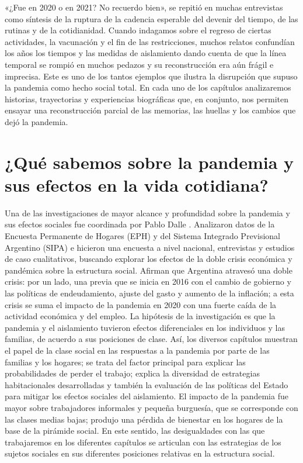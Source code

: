 \begin{refsection}
«¿Fue en 2020 o en 2021? No recuerdo bien», se repitió en muchas entrevistas como síntesis de la ruptura de la cadencia esperable del devenir del tiempo, de las rutinas y de la cotidianidad. Cuando indagamos sobre el regreso de ciertas actividades, la vacunación y el fin de las restricciones, muchos relatos confundían los años los tiempos y las medidas de aislamiento dando cuenta de que la línea temporal se rompió en muchos pedazos y su reconstrucción era aún frágil e imprecisa. Este es uno de los tantos ejemplos que ilustra la disrupción que supuso la pandemia como hecho social total. En cada uno de los capítulos analizaremos historias, trayectorias y experiencias biográficas que, en conjunto, nos permiten ensayar una reconstrucción parcial de las memorias, las huellas y los cambios que dejó la pandemia.


\section[¿Qué sabemos sobre la pandemia y sus efectos en la vida cotidiana?]{¿Qué sabemos sobre la pandemia y sus efectos en la vida cotidiana?}
\label{cap-21.que-sabemos-sobre-la-pandemia-y-sus-efectos-en-la-vida-cotidiana}
Una de las investigaciones de mayor alcance y profundidad sobre la pandemia y sus efectos sociales fue coordinada por Pablo Dalle \protect\parencite*{4181-DALLE2022}. Analizaron datos de la Encuesta Permanente de Hogares (EPH) y del Sistema Integrado Previsional Argentino (SIPA) e hicieron una encuesta a nivel nacional, entrevistas y estudios de caso cualitativos, buscando explorar los efectos de la doble crisis económica y pandémica sobre la estructura social. Afirman que Argentina atravesó una doble crisis: por un lado, una previa que se inicia en 2016 con el cambio de gobierno y las políticas de endeudamiento, ajuste del gasto y aumento de la inflación; a esta crisis se suma el impacto de la pandemia en 2020 con una fuerte caída de la actividad económica y del empleo. La hipótesis de la investigación es que la pandemia y el aislamiento tuvieron efectos diferenciales en los individuos y las familias, de acuerdo a sus posiciones de clase. Así, los diversos capítulos muestran el papel de la clase social en las respuestas a la pandemia por parte de las familias y los hogares; se trata del factor principal para explicar las probabilidades de perder el trabajo; explica la diversidad de estrategias habitacionales desarrolladas y también la evaluación de las políticas del Estado para mitigar los efectos sociales del aislamiento. El impacto de la pandemia fue mayor sobre trabajadores informales y pequeña burguesía, que se corresponde con las clases medias bajas; produjo una pérdida de bienestar en los hogares de la base de la pirámide social. En este sentido, las desigualdades con las que trabajaremos en los diferentes capítulos se articulan con las estrategias de los sujetos sociales en sus diferentes posiciones relativas en la estructura social.


\end{refsection}
